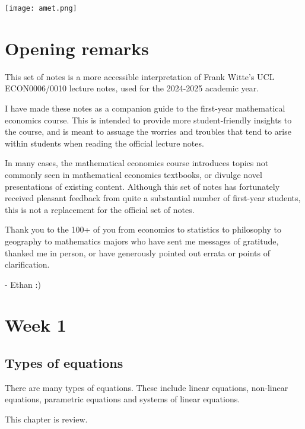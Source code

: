 \documentclass[a4paper, 12pt,oneside,openany]{book}
\begin{document}
\begin{titlepage}
\begin{center}
\texttt{[image: amet.png]}

   \end{center}
\end{titlepage}
\dominitoc[n]
\sffamily

\tableofcontents

\clearpage
\pagestyle{fancy}
\chapter{Opening remarks}

This set of notes is a more accessible interpretation of Frank Witte's UCL ECON0006/0010 lecture notes, used for the 2024-2025 academic year.

I have made these notes as a companion guide to the first-year mathematical economics course. This is intended to provide more student-friendly insights to the course, and is meant to assuage the worries and troubles that tend to arise within students when reading the official lecture notes. 

In many cases, the mathematical economics course introduces topics not commonly seen in mathematical economics textbooks, or divulge novel presentations of existing content. Although this set of notes has fortunately received pleasant feedback from quite a substantial number of first-year students, this is not a replacement for the official set of notes.

Thank you to the 100+ of you from economics to statistics to philosophy to geography to mathematics majors who have sent me messages of gratitude, thanked me in person, or have generously pointed out errata or points of clarification.

- Ethan :)

\chapter{Week 1}

\section{Types of equations}

There are many types of equations. These include linear equations, non-linear equations, parametric equations and systems of linear equations.

This chapter is review.
\end{document}

